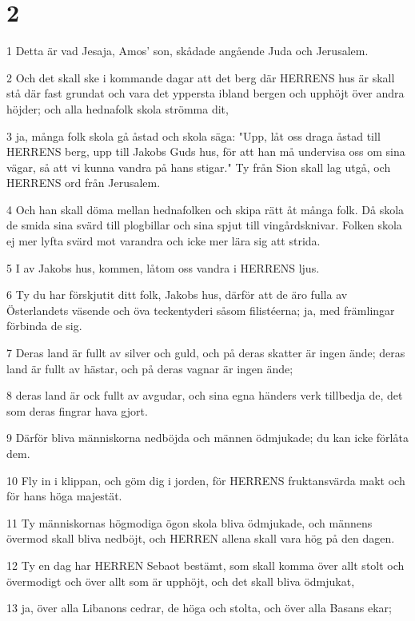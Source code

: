 \chapter{2}

\par 1 Detta är vad Jesaja, Amos' son, skådade angående Juda och Jerusalem.
\par 2 Och det skall ske i kommande dagar att det berg där HERRENS hus är skall stå där fast grundat och vara det yppersta ibland bergen och upphöjt över andra höjder; och alla hednafolk skola strömma dit,
\par 3 ja, många folk skola gå åstad och skola säga: "Upp, låt oss draga åstad till HERRENS berg, upp till Jakobs Guds hus, för att han må undervisa oss om sina vägar, så att vi kunna vandra på hans stigar." Ty från Sion skall lag utgå, och HERRENS ord från Jerusalem.
\par 4 Och han skall döma mellan hednafolken och skipa rätt åt många folk. Då skola de smida sina svärd till plogbillar och sina spjut till vingårdsknivar. Folken skola ej mer lyfta svärd mot varandra och icke mer lära sig att strida.
\par 5 I av Jakobs hus, kommen, låtom oss vandra i HERRENS ljus.
\par 6 Ty du har förskjutit ditt folk, Jakobs hus, därför att de äro fulla av Österlandets väsende och öva teckentyderi såsom filistéerna; ja, med främlingar förbinda de sig.
\par 7 Deras land är fullt av silver och guld, och på deras skatter är ingen ände; deras land är fullt av hästar, och på deras vagnar är ingen ände;
\par 8 deras land är ock fullt av avgudar, och sina egna händers verk tillbedja de, det som deras fingrar hava gjort.
\par 9 Därför bliva människorna nedböjda och männen ödmjukade; du kan icke förlåta dem.
\par 10 Fly in i klippan, och göm dig i jorden, för HERRENS fruktansvärda makt och för hans höga majestät.
\par 11 Ty människornas högmodiga ögon skola bliva ödmjukade, och männens övermod skall bliva nedböjt, och HERREN allena skall vara hög på den dagen.
\par 12 Ty en dag har HERREN Sebaot bestämt, som skall komma över allt stolt och övermodigt och över allt som är upphöjt, och det skall bliva ödmjukat,
\par 13 ja, över alla Libanons cedrar, de höga och stolta, och över alla Basans ekar;
